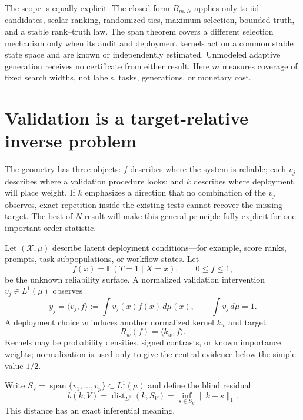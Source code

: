 \documentclass[10pt,twocolumn]{article}
\newcommand{\Prb}{\mathbb{P}}
\newcommand{\dist}{\operatorname{dist}}
\newcommand{\Span}{\operatorname{span}}
\begin{document}
The scope is equally explicit. The closed form $B_{m,N}$ applies only to iid candidates, scalar ranking, randomized ties, maximum selection, bounded truth, and a stable rank--truth law. The span theorem covers a different selection mechanism only when its audit and deployment kernels act on a common stable state space and are known or independently estimated. Unmodeled adaptive generation receives no certificate from either result. Here $m$ measures coverage of fixed search widths, not labels, tasks, generations, or monetary cost.
\section*{Validation is a target-relative inverse problem}

The geometry has three objects: $f$ describes where the system is reliable; each $v_j$ describes where a validation procedure looks; and $k$ describes where deployment will place weight. If $k$ emphasizes a direction that no combination of the $v_j$ observes, exact repetition inside the existing tests cannot recover the missing target. The best-of-$N$ result will make this general principle fully explicit for one important order statistic.

Let $(\mathcal X,\mu)$ describe latent deployment conditions---for example, score ranks, prompts, task subpopulations, or workflow states. Let
\begin{equation}
f(x)=\Prb(T=1\mid X=x),\qquad 0\le f\le1,
\label{eq:surface}
\end{equation}
be the unknown reliability surface. A normalized validation intervention $v_j\in L^1(\mu)$ observes
\begin{equation}
y_j=\langle v_j,f\rangle:=\int v_j(x)f(x)\,d\mu(x),
\qquad \int v_j\,d\mu=1.
\label{eq:validation}
\end{equation}
A deployment choice $w$ induces another normalized kernel $k_w$ and target
\begin{equation}
R_w(f)=\langle k_w,f\rangle.
\label{eq:target}
\end{equation}
Kernels may be probability densities, signed contrasts, or known importance weights; normalization is used only to give the central evidence below the simple value $1/2$.

Write $S_V=\Span\{v_1,\ldots,v_p\}\subset L^1(\mu)$ and define the blind residual
\begin{equation}
b(k;V)=\dist_{L^1}(k,S_V)
=\inf_{s\in S_V}\|k-s\|_1.
\label{eq:blindresidual}
\end{equation}
This distance has an exact inferential meaning.
\end{document}
